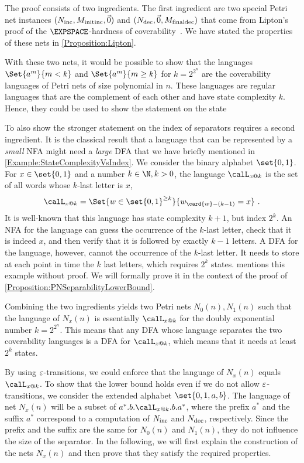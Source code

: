 \documentclass[../../diss.tex]{subfiles}
\begin{document}
The proof consists of two ingredients.
The first ingredient are two special Petri net instances $(N_{\text{inc}},M_{{\text{init}}{\text{inc}}},\vec{0})$ and $(N_{\text{dec}},\vec{0},M_{{\text{final}}{\text{dec}}})$ that come from Lipton's proof of the $\EXPSPACE$-hardness of coverability~\cite{Lipton76}.
We have stated the properties of these nets in \cref{Proposition:Lipton}.

With these two nets, it would be possible to show that the languages $\Set{a^m}{m < k}$ and $\Set{a^m}{m \geq k}$ for $k = 2^{2^n}$ are the coverability languages of Petri nets of size polynomial in $n$.
These languages are regular languages that are the complement of each other and have state complexity $k$.
Hence, they could be used to show the statement on the state 

To also show the stronger statement on the index of separators requires a second ingredient.
It is the classical result that a language that can be represented by a \emph{small} NFA might need a \emph{large} DFA that we have briefly mentioned in \cref{Example:StateComplexityVsIndex}.
We consider the binary alphabet $\set{0,1}$.
For $x \in \set{0,1}$ and a number $k \in \N, k > 0$, the language $\calL_{x @ k}$ is the set of all words whose $k$-last letter is $x$,
\[
    \calL_{x @ k} = \Set{ w \in \set{0,1}^{\geq k}}{ w_{\card{w} - {(k-1)}} = x}
    \ .
\]
It is well-known that this language has state complexity $k+1$, but index $2^k$.
An NFA for the language can guess the occurrence of the $k$-last letter, check that it is indeed $x$, and then verify that it is followed by exactly $k-1$ letters.
A DFA for the language, however, cannot the occurrence of the $k$-last letter.
It needs to store at each point in time the $k$ last letters, which requires $2^k$ states.
 mentions this example without proof.
We will formally prove it in the context of the proof of \cref{Proposition:PNSeparabilityLowerBound}.

Combining the two ingredients yields two Petri nets $N_0(n), N_1(n)$ such that the language of $N_x(n)$ is essentially $\calL_{x @ k}$ for the doubly exponential number $k = 2^{2^n}$.
This means that any DFA whose language separates the two coverability languages is a DFA for $\calL_{x @ k}$, which means that it needs at least $2^k$ states.

By using $\varepsilon$-transitions, we could enforce that the language of $N_x(n)$ equals $\calL_{x @ k}$.
To show that the lower bound holds even if we do not allow $\varepsilon$-transitions, we consider the extended alphabet $\set{0,1,a,b}$.
The language of net $N_x(n)$ will be a subset of $a^*.b.\calL_{x @ k}.b.a^*$, where the prefix $a^*$ and the suffix $a^*$ correspond to a computation of $N_{\text{inc}}$ and $N_{\text{dec}}$, respectively.
Since the prefix and the suffix are the same for $N_0(n)$ and $N_1(n)$, they do not influence the size of the separator.
In the following, we will first explain the construction of the nets $N_x(n)$ and then prove that they satisfy the required properties.
\end{document}

